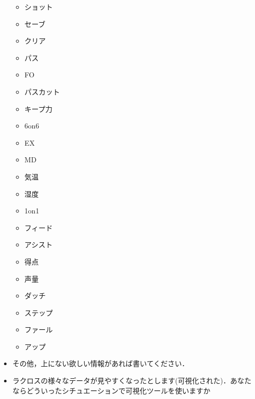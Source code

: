\documentclass[sotsuron]{kuee}
\begin{document}
\begin{itemize}
\begin{itemize}
				\item ショット
				\item セーブ
				\item クリア
				\item パス
				\item FO
				\item パスカット
				\item キープ力
				\item 6on6
				\item EX
				\item MD
				\item 気温
				\item 湿度
				\item 1on1
				\item フィード
				\item アシスト
				\item 得点
				\item 声量
				\item ダッチ
				\item ステップ
				\item ファール
				\item アップ
			\end{itemize}
		\item その他，上にない欲しい情報があれば書いてください．
		\item ラクロスの様々なデータが見やすくなったとします(可視化された)．あなたならどういったシチュエーションで可視化ツールを使いますか
	\end{itemize}
\end{document}
